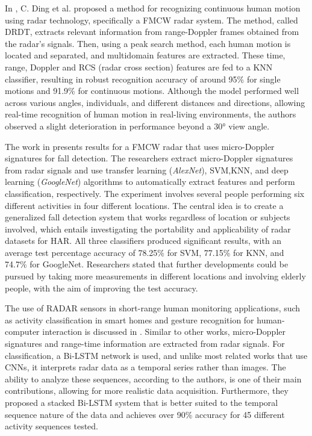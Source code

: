 In \cite{SOA_DRDTmap_features}, C. Ding et al. proposed a method for recognizing continuous human motion using radar technology, specifically a \gls{FMCW} radar system. The method, called \gls{DRDT}, extracts relevant information from range-Doppler frames obtained from the radar's signals. Then, using a peak search method, each human motion is located and separated, and multidomain features are extracted. These time, range, Doppler and RCS (radar cross section) features are fed to a \gls{KNN} classifier, resulting in robust recognition accuracy of around 95\% for single motions and 91.9\% for continuous motions. Although the model performed well across various angles, individuals, and different distances and directions, allowing real-time recognition of human motion in real-living environments, the authors observed a slight deterioration in performance beyond a 30° view angle.

The work in \cite{SOA_datasetPortability} presents results for a FMCW radar that uses micro-Doppler signatures for fall detection. The researchers extract micro-Doppler signatures from radar signals and use transfer learning (\textit{AlexNet}), \gls{SVM},\gls{KNN}, and deep learning (\textit{GoogleNet}) algorithms to automatically extract features and perform classification, respectively. The experiment involves several people performing six different activities in four different locations. The central idea is to create a generalized fall detection system that works regardless of location or subjects involved, which entails investigating the portability and applicability of radar datasets for \gls{HAR}. All three classifiers produced significant results, with an average test percentage accuracy of 78.25\% for SVM, 77.15\% for KNN, and 74.7\% for GoogleNet. Researchers stated that further developments could be pursued by taking more measurements in different locations and involving elderly people, with the aim of improving the test accuracy.

The use of RADAR sensors in short-range human monitoring applications, such as activity classification in smart homes and gesture recognition for human-computer interaction is discussed in \cite{SOA_FMCW_biLSTM}. Similar to other works, micro-Doppler signatures and range-time information are extracted from radar signals. For classification, a \gls{Bi-LSTM} network is used, and unlike most related works that use \glspl{CNN}, it interprets radar data as a temporal series rather than images. The ability to analyze these sequences, according to the authors, is one of their main contributions, allowing for more realistic data acquisition. Furthermore, they proposed a stacked \gls{Bi-LSTM} system that is better suited to the temporal sequence nature of the data and achieves over 90\% accuracy for 45 different activity sequences tested.

